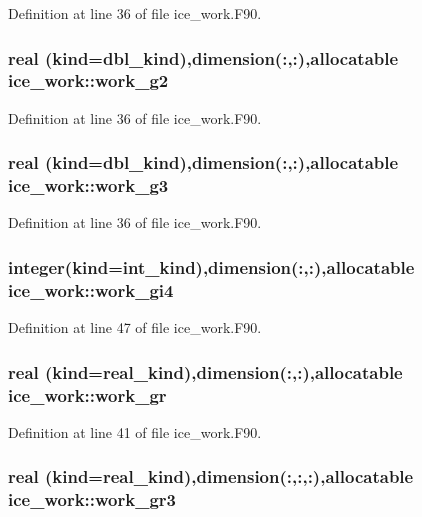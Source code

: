 Definition at line 36 of file ice\_\-work.F90.\hypertarget{namespaceice__work_abfbbe39f5e047d0db457513d4f779e15}{
\subsubsection[{work\_\-g2}]{\setlength{\rightskip}{0pt plus 5cm}real (kind=dbl\_\-kind),dimension(:,:),allocatable {\bf ice\_\-work::work\_\-g2}}}
\label{namespaceice__work_abfbbe39f5e047d0db457513d4f779e15}


Definition at line 36 of file ice\_\-work.F90.\hypertarget{namespaceice__work_a929bf2491f92c1f877144e7551e715b2}{
\subsubsection[{work\_\-g3}]{\setlength{\rightskip}{0pt plus 5cm}real (kind=dbl\_\-kind),dimension(:,:),allocatable {\bf ice\_\-work::work\_\-g3}}}
\label{namespaceice__work_a929bf2491f92c1f877144e7551e715b2}


Definition at line 36 of file ice\_\-work.F90.\hypertarget{namespaceice__work_af91dc6e8e0c9382cf3f2a9b6e5cd8f05}{
\subsubsection[{work\_\-gi4}]{\setlength{\rightskip}{0pt plus 5cm}integer(kind=int\_\-kind),dimension(:,:),allocatable {\bf ice\_\-work::work\_\-gi4}}}
\label{namespaceice__work_af91dc6e8e0c9382cf3f2a9b6e5cd8f05}


Definition at line 47 of file ice\_\-work.F90.\hypertarget{namespaceice__work_aac80d822929fda3078c9f14d2232e309}{
\subsubsection[{work\_\-gr}]{\setlength{\rightskip}{0pt plus 5cm}real (kind=real\_\-kind),dimension(:,:),allocatable {\bf ice\_\-work::work\_\-gr}}}
\label{namespaceice__work_aac80d822929fda3078c9f14d2232e309}


Definition at line 41 of file ice\_\-work.F90.\hypertarget{namespaceice__work_a0891f9d671557b4379b9685923a8b4b2}{
\subsubsection[{work\_\-gr3}]{\setlength{\rightskip}{0pt plus 5cm}real (kind=real\_\-kind),dimension(:,:,:),allocatable {\bf ice\_\-work::work\_\-gr3}}}
\label{namespaceice__work_a0891f9d671557b4379b9685923a8b4b2}


